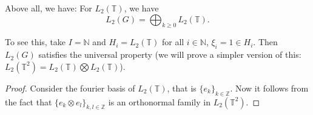 Above all, we have:
    For $L_2(\mathbb{T})$, we have
        \[  L_2(G)=\bigoplus_{k\geq0}L_2(\mathbb{T}).   \]

To see this, take $I=\mathbb{N}$ and $H_i=L_2(\mathbb{T})$ for all $i\in\mathbb{N}$, $\xi_i=1\in H_i$. Then $L_2(G)$ satisfies the universal property (we will prove a simpler version of this: $L_2(\mathbb{T}^2)=L_2(\mathbb{T})\bigotimes L_2(\mathbb{T})$).

\begin{proof}
    Consider the fourier basis of $L_2(\mathbb{T})$, that is $\{e_k\}_{k\in\mathbb{Z}}$. 
    Now it follows from the fact that $\{e_k\otimes e_l\}_{k,l\in\mathbb{Z}}$ is an orthonormal family in $L_2(\mathbb{T}^2)$.
\end{proof}

